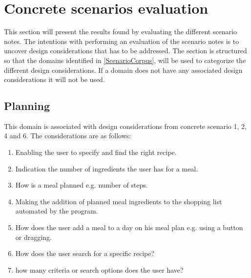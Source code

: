 \section{Concrete scenarios evaluation}  
This section will present the results found by evaluating the different scenario notes. The intentions with performing an evaluation of the scenario notes is to uncover design considerations that has to be addressed. The section is structured so that the domains identified in \cref{ScenarioCorpus}, will be used to categorize the different design considerations. If a domain does not have any associated design considerations it will not be used.  

\subsection{Planning}
This domain is associated with design considerations from concrete scenario 1, 2, 4 and 6. The considerations are as follows:

\begin{enumerate}
	\item Enabling the user to specify and find the right recipe.	
	\item Indication the number of ingredients the user has for a meal.
	\item How is a meal planned e.g. number of steps.
	\item Making the addition of planned meal ingredients to the shopping list automated by the program.
	\item How does the user add a meal to a day on his meal plan e.g. using a button or dragging.
	\item How does the user search for a specific recipe?
	\item how many criteria or search options does the user have?
\end{enumerate}




